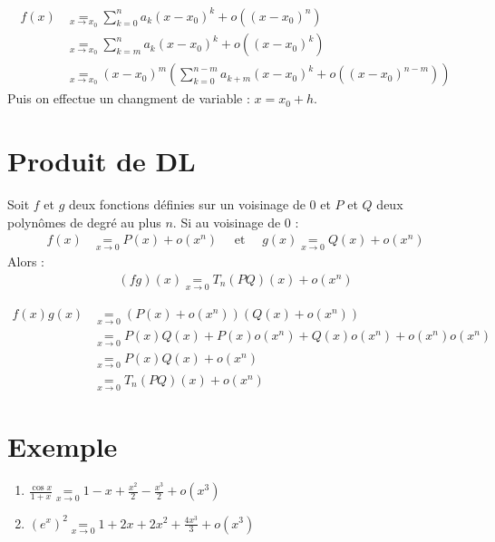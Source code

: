 \documentclass[../main.tex]{subfiles}
\begin{document}
\begin{align*}
    f(x) &\underset{x\to x_0}{=} \sum_{k=0}^{n} a_k (x - x_0)^k + o((x - x_0)^n) \\
    &\underset{x\to x_0}{=} \sum_{k=m}^{n} a_k (x - x_0)^k + o((x - x_0)^k) \\
    &\underset{x\to x_0}{=} (x - x_0)^m \left( \sum_{k=0}^{n-m} a_{k+m} (x - x_0)^k + o((x - x_0)^{n-m}) \right)
\end{align*}
Puis on effectue un changment de variable : $x = x_0 + h$.

\section{Produit de DL}
\begin{tcolorbox}[title=Propostion 25.56, title filled=false, colframe=lightblue, colback=lightblue!10!white]
    Soit $f$ et $g$ deux fonctions définies sur un voisinage de $0$ et $P$ et $Q$ deux polynômes de degré au plus $n$. Si au voisinage de $0$ : 
    \begin{align*}
        f(x) &\underset{x\to 0}{=} P(x) + o(x^n) \quad \text{ et } \quad g(x) \underset{x\to 0}{=} Q(x) + o(x^n)
    \end{align*}
    Alors : 
    \begin{align*}
        (fg)(x) \underset{x\to 0}{=} T_n(PQ)(x) + o(x^n)
    \end{align*}
\end{tcolorbox}

\begin{align*}
    f(x)g(x) &\underset{x\to 0}{=} (P(x) + o(x^n))(Q(x) + o(x^n)) \\
    &\underset{x\to 0}{=} P(x)Q(x) + P(x)o(x^n) + Q(x)o(x^n) + o(x^n)o(x^n) \\
    &\underset{x\to 0}{=} P(x)Q(x) + o(x^n) \\
    &\underset{x\to 0}{=} T_n(PQ)(x) + o(x^n)
\end{align*}

\section{Exemple}
\begin{tcolorbox}[title=Exemple 25.57, title filled=false, colframe=darkgreen, colback=darkgreen!10!white]
    \begin{enumerate}
        \item $\frac{\cos x}{1 + x} \underset{x\to 0}{=} 1 - x + \frac{x^2}{2} - \frac{x^3}{2} + o(x^3)$
        \item $(e^x)^2 \underset{x\to 0}{=} 1 + 2x + 2x^2 + \frac{4x^3}{3} + o(x^3)$
    \end{enumerate}
\end{tcolorbox}
\end{document}
